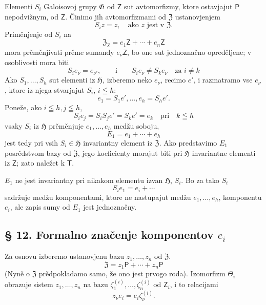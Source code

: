 \documentclass[11pt]{article}
\begin{document}
Elementi \(S_i\) Galoisovoj grupy \(\mathfrak G\) od \(\mathsf Z\) sut avtomorfizmy, ktore ostavjajut \(\mathsf P\) nepodvižnym, od \(\mathsf Z\). Činimo jih avtomorfizmami od \(\mathfrak Z\) ustanovjenjem
\[
S_i z=z,\quad \text{ako } z \text{ jest v } \mathfrak Z.
\]
Priměnjenje od \(S_i\) na
\[
\mathfrak Z_{\mathsf Z}=e_1\mathsf Z+\cdots+e_n\mathsf Z
\]
mora prěměnjivati prěme sumandy \(e_\nu\mathsf Z\), bo one sut jednoznačno opreděljene; v osoblivosti mora biti
\[
S_i e_\nu=e_{\nu'},\qquad\text{i}\qquad S_i e_\nu\ne S_k e_\nu
\quad\text{za } i\ne k
\]
Ako \(S_1,\ldots,S_h\) sut elementi iz \(\mathfrak H\), izberemo neko \(e_\nu\), recimo \(e'\), i razmatramo vse \(e_\nu\), ktore iz njega stvarjajut \(S_i\), \(i\leqq h\):
\[
e_1=S_1e',\ldots,e_h=S_he'.
\]
Poneže, ako \(i\leqq h, j\leqq h\),
\[
S_i e_j=S_iS_j e'=S_ke'=e_k \quad \text{pri}\quad k\leqq h
\]
vsaky \(S_i\) iz \(\mathfrak H\) prěměnjuje \(e_1,\ldots,e_h\) medžu soboju,
\[
E_1=e_1+\cdots+e_h
\]
jest tedy pri vsih \(S_i\in\mathfrak H\) invariantny element iz \(\mathfrak Z\). Ako predstavimo \(E_1\) posrědstvom bazy od \(\mathfrak Z\), jego koeficienty morajut biti pri \(\mathfrak H\) invariantne elementi iz \(\mathsf Z\); zato naležet k \(\mathsf T\).

\(E_1\) ne jest invariantny pri nikakom elementu izvan \(\mathfrak H\), \(S_i\). Bo za tako \(S_i\)
\[
S_i e_1=e_i+\cdots
\]
sadržuje medžu komponentami, ktore ne nastupajut medžu \(e_1,\ldots,e_h\), komponentu \(e_i\), ale zapis sumy od \(E_1\) jest jednoznačny.

\subsection*{§ 12. Formalno značenje komponentov \(e_i\)}\label{die-formale-bedeutung-der-komponenten-ei}

Za osnovu izberemo ustanovjenu bazu \(z_1,\ldots,z_n\) od \(\mathfrak Z\).
\[
\mathfrak Z=z_1\mathsf P+\cdots+z_n\mathsf P
\]
(Nyně o \(\mathfrak Z\) prědpokladamo samo, že ono jest prvogo roda). Izomorfizm \(\Theta_i\) obrazuje sistem \(z_1,\ldots,z_n\) na bazu \(\zeta_1^{(i)},\ldots,\zeta_n^{(i)}\) od \(\mathsf Z_i\), i to relacijami
\[
z_\nu e_i=e_i\zeta_\nu^{(i)} .
\]
\end{document}
